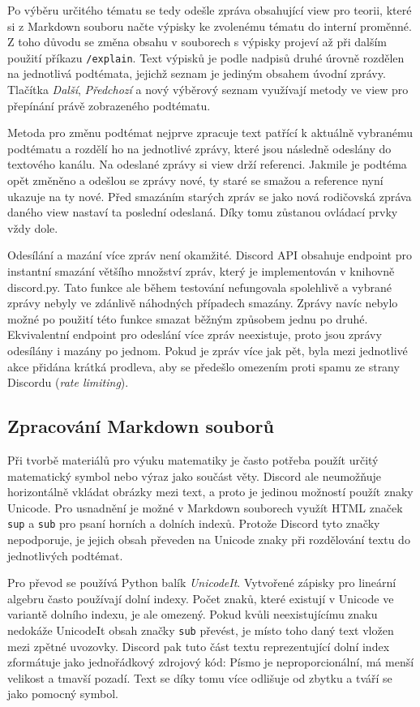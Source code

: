 \documentclass[FM]{tulthesis}
\begin{document}
	Po výběru určitého tématu se tedy odešle zpráva obsahující view pro teorii, které si z Markdown souboru načte výpisky ke zvolenému tématu do interní proměnné. Z toho důvodu se změna obsahu v souborech s výpisky projeví až při dalším použití příkazu \verb|/explain|. Text výpisků je podle nadpisů druhé úrovně rozdělen na jednotlivá podtémata, jejichž seznam je jediným obsahem úvodní zprávy. Tlačítka \textit{Další}, \textit{Předchozí} a nový výběrový seznam využívají metody ve view pro přepínání právě zobrazeného podtématu.
	
	Metoda pro změnu podtémat nejprve zpracuje text patřící k aktuálně vybranému podtématu a rozdělí ho na jednotlivé zprávy, které jsou následně odeslány do textového kanálu. Na odeslané zprávy si view drží referenci. Jakmile je podtéma opět změněno a odešlou se zprávy nové, ty staré se smažou a reference nyní ukazuje na ty nové. Před smazáním starých zpráv se jako nová rodičovská zpráva daného view nastaví ta poslední odeslaná. Díky tomu zůstanou ovládací prvky vždy dole.
	
	Odesílání a mazání více zpráv není okamžité. Discord API obsahuje endpoint pro instantní smazání většího množství zpráv, který je implementován v knihovně discord.py. Tato funkce ale během testování nefungovala spolehlivě a vybrané zprávy nebyly ve zdánlivě náhodných případech smazány. Zprávy navíc nebylo možné po použití této funkce smazat běžným způsobem jednu po druhé. Ekvivalentní endpoint pro odeslání více zpráv neexistuje, proto jsou zprávy odesílány i mazány po jednom. Pokud je zpráv více jak pět, byla mezi jednotlivé akce přidána krátká prodleva, aby se předešlo omezením proti spamu ze strany Discordu (\textit{rate limiting}).

	\subsection{Zpracování Markdown souborů}
	
	Při tvorbě materiálů pro výuku matematiky je často potřeba použít určitý matematický symbol nebo výraz jako součást věty. Discord ale neumožňuje horizontálně vkládat obrázky mezi text, a proto je jedinou možností použít znaky Unicode. Pro usnadnění je možné v Markdown souborech využít HTML značek \verb|sup| a \verb|sub| pro psaní horních a dolních indexů. Protože Discord tyto značky nepodporuje, je jejich obsah převeden na Unicode znaky při rozdělování textu do jednotlivých podtémat.
	
	Pro převod se používá Python balík \textit{UnicodeIt}. Vytvořené zápisky pro lineární algebru často používají dolní indexy. Počet znaků, které existují v Unicode ve variantě dolního indexu, je ale omezený. Pokud kvůli neexistujícímu znaku nedokáže UnicodeIt obsah značky \verb|sub| převést, je místo toho daný text vložen mezi zpětné uvozovky. Discord pak tuto část textu reprezentující dolní index zformátuje jako jednořádkový zdrojový kód: Písmo je neproporcionální, má menší velikost a tmavší pozadí. Text se díky tomu více odlišuje od zbytku a tváří se jako pomocný symbol.
	
\end{document}
